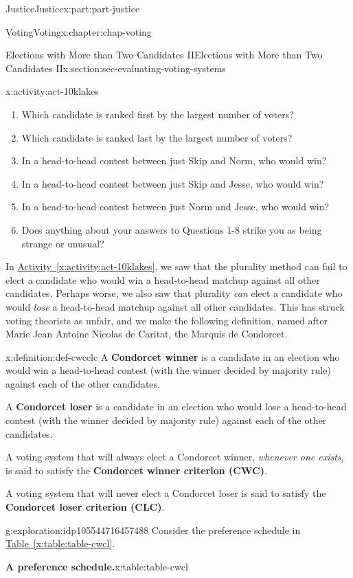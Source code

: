 \documentclass[oneside,10pt,]{book}
\newcommand{\xreffont}{\relax}
\newcommand{\terminology}[1]{\textbf{#1}}
\numberwithin{equation}{section}
\begin{document}
\begin{partptx}{Justice}{}{Justice}{}{}{x:part:part-justice}
\begin{chapterptx}{Voting}{}{Voting}{}{}{x:chapter:chap-voting}
\begin{sectionptx}{Elections with More than Two Candidates II}{}{Elections with More than Two Candidates II}{}{}{x:section:sec-evaluating-voting-systems}
\begin{activity}{}{x:activity:act-10klakes}
\begin{enumerate}
\item{}Which candidate is ranked first by the largest number of voters?%
\item{}Which candidate is ranked last by the largest number of voters?%
\item{}In a head-to-head contest between just Skip and Norm, who would win?%
\item{}In a head-to-head contest between just Skip and Jesse, who would win?%
\item{}In a head-to-head contest between just Norm and Jesse, who would win?%
\item{}Does anything about your answers to Questions 1-8 strike you as being strange or unusual?%
\end{enumerate}
\end{activity}%
In \hyperref[x:activity:act-10klakes]{Activity~{\xreffont\ref{x:activity:act-10klakes}}}, we saw that the plurality method can fail to elect a candidate who would win a head-to-head matchup against all other candidates. Perhaps worse, we also saw that plurality \emph{can} elect a candidate who would \emph{lose} a head-to-head matchup against all other candidates. This has struck voting theorists as unfair, and we make the following definition, named after Marie Jean Antoine Nicolas de Caritat, the Marquis de Condorcet.%
\begin{definition}{}{x:definition:def-cwcclc}%
A \terminology{Condorcet winner} is a candidate in an election who would win a head-to-head contest (with the winner decided by majority rule) against each of the other candidates.%
\par
A \terminology{Condorcet loser} is a candidate in an election who would lose a head-to-head contest (with the winner decided by majority rule) against each of the other candidates.%
\par
A voting system that will always elect a Condorcet winner, \emph{whenever one exists}, is said to satisfy the \terminology{Condorcet winner criterion (CWC)}.%
\par
A voting system that will never elect a Condorcet loser is said to satisfy the \terminology{Condorcet loser criterion (CLC)}.%
\end{definition}
\begin{exploration}{}{g:exploration:idp105544716457488}%
Consider the preference schedule in \hyperref[x:table:table-cwcl]{Table~{\xreffont\ref{x:table:table-cwcl}}}.%
\begin{tableptx}{\textbf{A preference schedule.}}{x:table:table-cwcl}{}%

\end{tableptx}
\end{exploration}
\end{sectionptx}
\end{chapterptx}
\end{partptx}
\end{document}
